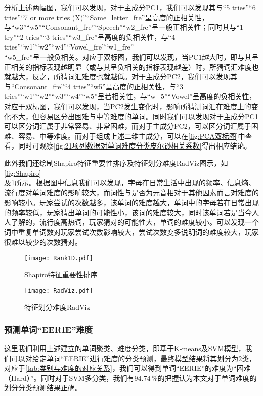 \documentclass{MathModeling}
\begin{document}
	分析上述两幅图，我们可以发现，对于主成分PC1，我们可以发现其与“5 tries”“6 tries”“7 or more tries (X)”“Same\_letter\_fre”呈高度的正相关性，与“w3”“w5”“Consonant\_fre”“Speech”“w2\_fre”呈一般正相关性；同时其与“1 try”“2 tries”“3 tries”“w3\_fre”呈高度的负相关性，与“4 tries”“w1”“w2”“w4”“Vowel\_fre”“w1\_fre”\\“w5\_fre”呈一般负相关。对应于双标图，我们可以发现，当PC1越大时，即与其呈正相关的指标表现越明显（或与其呈负相关的指标表现越差）时，所猜词汇难度也就越大，反之，所猜词汇难度也就越低。对于主成分PC2，我们可以发现其与“Consonant\_fre”“4 tries”“w5”呈高度的正相关性，与“3 tries”“w1”“w2”“w3”“w4”“w5”呈若相关性，与“w\_5”“Vowel”呈高度的负相关性，对应于双标图，我们可以发现，当PC2发生变化时，影响所猜测词汇在难度上的变化不大，但容易区分出困难与中等难度的单词。同时我们可以发现对于主成分PC1可以区分词汇属于非常容易、非常困难，而对于主成分PC2，可以区分词汇属于困难、容易、中等难度。而对于组成上述二维主成分，可以在\textcolor{blue}{\cref{fig:PCA双标图}}中查看，同时可观察\textcolor{blue}{\cref{fig:21项列数据对单词难度分类皮尔逊相关系数}}得出相应结论。

	此外我们还绘制Shapiro特征重要性排序及特征划分难度RadViz图示，如\textcolor{blue}{\cref{fig:Shapiro}}\\
	及\textcolor{blue}{\cref{fig:RadViz}}所示。根据图中信息我们可以发现，字母在日常生活中出现的频率、信息熵、流行度对单词难度的影响较大，而词性与是否为元音相对于其他因素而言对难度的影响较小。玩家尝试的次数越多，该单词的难度越大，单词中的字母若在日常出现的频率较低，玩家猜出单词的可能性小，该词的难度较大，同时该单词若是当今人人了解的，流行度高热词，玩家猜对的可能性大，单词的难度较小。可以发现一个词中重复单词数对玩家尝试次数影响较大，尝试次数变多说明词的难度较大，玩家很难以较少的次数猜对。
	\begin{figure}[htbp]
		\centering
		\begin{minipage}{0.48\linewidth}
			\centering
			\texttt{[image: Rank1D.pdf]}
			\caption{Shapiro特征重要性排序}
			\label{fig:Shapiro}
		\end{minipage}
		\begin{minipage}{0.48\linewidth}
			\centering
			\texttt{[image: RadViz.pdf]}
			\caption{特征划分难度RadViz}
			\label{fig:RadViz}
		\end{minipage}
	\end{figure}

	\subsubsection{预测单词“EERIE”难度}
	这里我们利用上述建立的单词聚类、难度分类，即基于K-means及SVM模型，我们可以对给定单词“EERIE”进行难度的分类预测，最终模型结果将其划分为$2$类，对应于\textcolor{blue}{\cref{tab:类别与难度的对应关系}}，我们可以得到单词“EERIE”的难度为“困难（Hard）”。同时对于SVM多分类，我们有$94.74\,\%$的把握认为本文对于单词难度的划分分类预测结果正确。
	
\end{document}
